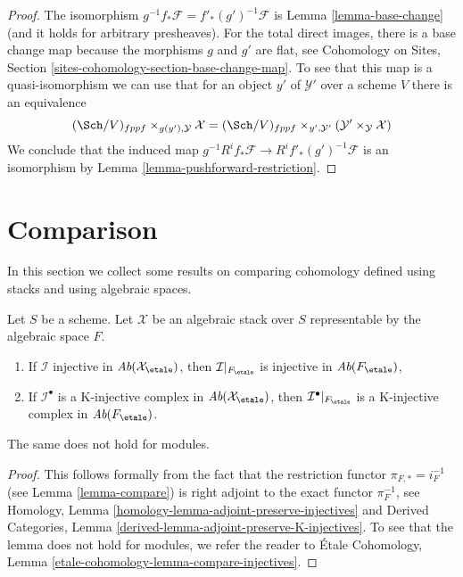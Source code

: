 \begin{proof}
The isomorphism $g^{-1}f_*\mathcal{F} = f'_*(g')^{-1}\mathcal{F}$ is
Lemma \ref{lemma-base-change} (and it holds for arbitrary presheaves).
For the total direct images, there is a base change map because the
morphisms $g$ and $g'$ are flat, see
Cohomology on Sites, Section \ref{sites-cohomology-section-base-change-map}.
To see that this map is a quasi-isomorphism we can use that for
an object $y'$ of $\mathcal{Y}'$ over a scheme $V$ there is an equivalence
$$
(\Sch/V)_{fppf} \times_{g(y'), \mathcal{Y}} \mathcal{X}
=
(\Sch/V)_{fppf} \times_{y', \mathcal{Y}'}
(\mathcal{Y}' \times_\mathcal{Y} \mathcal{X})
$$
We conclude that the induced map
$g^{-1}R^if_*\mathcal{F} \to R^if'_*(g')^{-1}\mathcal{F}$
is an isomorphism by
Lemma \ref{lemma-pushforward-restriction}.
\end{proof}












\section{Comparison}
\label{section-compare}

\noindent
In this section we collect some results on comparing cohomology defined
using stacks and using algebraic spaces.

\begin{lemma}
\label{lemma-compare-injectives}
Let $S$ be a scheme. Let $\mathcal{X}$ be an algebraic stack over $S$
representable by the algebraic space $F$.
\begin{enumerate}
\item If $\mathcal{I}$ injective in $\textit{Ab}(\mathcal{X}_\etale)$, then
$\mathcal{I}|_{F_\etale}$ is injective in $\textit{Ab}(F_\etale)$,
\item If $\mathcal{I}^\bullet$ is a K-injective complex in
$\textit{Ab}(\mathcal{X}_\etale)$, then $\mathcal{I}^\bullet|_{F_\etale}$
is a K-injective complex in $\textit{Ab}(F_\etale)$.
\end{enumerate}
The same does not hold for modules.
\end{lemma}

\begin{proof}
This follows formally from the fact that the restriction functor
$\pi_{F, *} = i_F^{-1}$ (see Lemma \ref{lemma-compare})
is right adjoint to the exact functor $\pi_F^{-1}$, see
Homology, Lemma \ref{homology-lemma-adjoint-preserve-injectives} and
Derived Categories, Lemma \ref{derived-lemma-adjoint-preserve-K-injectives}.
To see that the lemma does not hold for modules, we refer the
reader to \'Etale Cohomology, Lemma
\ref{etale-cohomology-lemma-compare-injectives}.
\end{proof}


